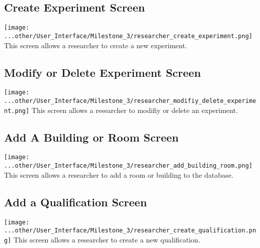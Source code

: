 \subsection{Create Experiment Screen}
\texttt{[image: ...other/User\_Interface/Milestone\_3/researcher\_create\_experiment.png]}
This screen allows a researcher to create a new experiment.

\subsection{Modify or Delete Experiment Screen}
\texttt{[image: ...other/User\_Interface/Milestone\_3/researcher\_modifiy\_delete\_experiment.png]}
This screen allows a researcher to modifiy or delete an experiment.

\subsection{Add A Building or Room Screen}
\texttt{[image: ...other/User\_Interface/Milestone\_3/researcher\_add\_building\_room.png]}
This screen allows a researcher to add a room or building to the database.

\subsection{Add a Qualification Screen}
\texttt{[image: ...other/User\_Interface/Milestone\_3/researcher\_create\_qualification.png]}
This screen allows a researcher to create a new qualification.